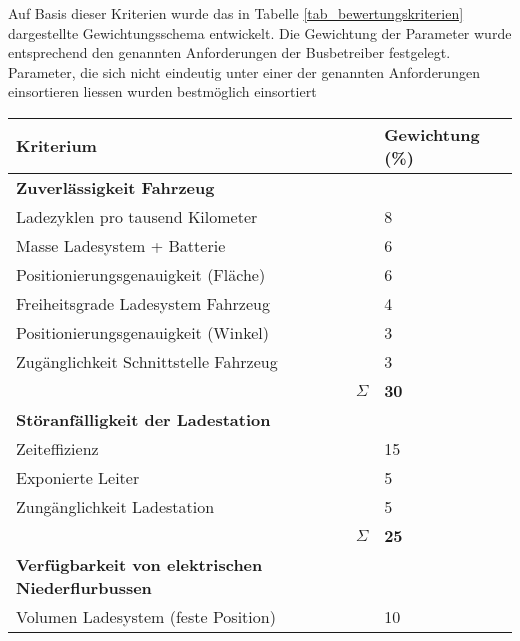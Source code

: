 Auf Basis dieser Kriterien wurde das in Tabelle \ref{tab_bewertungskriterien} dargestellte Gewichtungsschema entwickelt. Die Gewichtung der Parameter wurde entsprechend den genannten Anforderungen der Busbetreiber festgelegt. Parameter, die sich nicht eindeutig unter einer der genannten Anforderungen einsortieren liessen wurden bestmöglich einsortiert
\begin{table}
	\centering
	\begin{tabularx}{\linewidth}{Xrl}
		\toprule
		Kriterium                                                &                   & Gewichtung (\%) \\ \midrule
		\textbf{Zuverlässigkeit Fahrzeug}                        &                   &  \\
		Ladezyklen pro tausend Kilometer                         &                   & 8               \\
		Masse Ladesystem + Batterie                              &                   & 6               \\
		Positionierungsgenauigkeit (Fläche)                      &                   & 6               \\
		Freiheitsgrade Ladesystem Fahrzeug                       &                   & 4               \\
		Positionierungsgenauigkeit (Winkel)                      &                   & 3               \\
		Zugänglichkeit Schnittstelle Fahrzeug                    &                   & 3               \\\midrule
		                                                         &          $\Sigma$ & \textbf{30}     \\
		\textbf{Störanfälligkeit der Ladestation}                &                   &  \\
		Zeiteffizienz                            &                   & 15              \\
		Exponierte Leiter                                        &                   & 5               \\
		Zungänglichkeit Ladestation                              &                   & 5               \\ \midrule
		                                                         &          $\Sigma$ & \textbf{25}     \\
		\textbf{Verfügbarkeit von elektrischen Niederflurbussen} &                   &  \\
		Volumen Ladesystem (feste Position)                      &                   & 10              \\

\end{tabularx}
\end{table}
